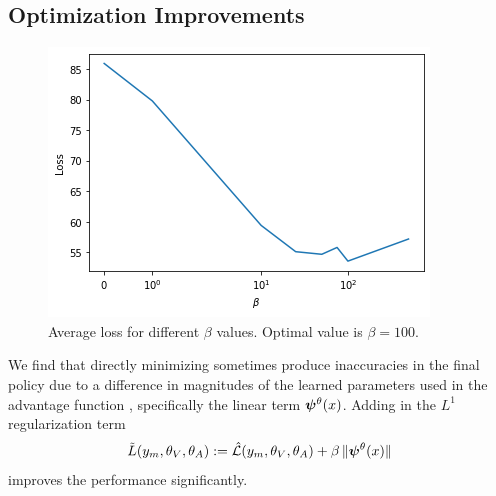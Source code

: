 \documentclass[onefignum,onetabnum]{siamonline171218}
\begin{document}

\subsection{Optimization Improvements}

\begin{figure}
\centering
\includegraphics[width=\linewidth]{Figures/loss_penalty.png}
\caption{Average loss for different $\beta$ values. Optimal value is $\beta = 100$.}
\label{fig:penalty_loss}
\end{figure}
We find that directly minimizing  sometimes produce inaccuracies in the final policy due to a difference in magnitudes of the learned parameters used in the advantage function , specifically the linear term $\bm{\psi}^{\theta}(x)$. Adding in the $L^1$ regularization term 
\begin{equation}
	\tilde{L}(y_m,\theta_V,\theta_A) := \hat{\mathcal{L}}(y_m,\theta_V,\theta_A) + \beta \, \| \bm{\psi}^{\theta}(x) \|
\end{equation}%
improves the performance significantly.
\end{document}
